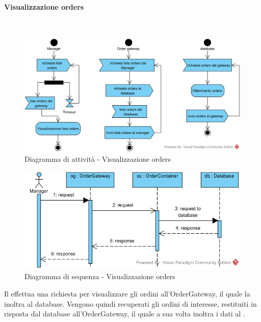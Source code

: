 \paragraph{Visualizzazione orders}\mbox{}\\
\nopagebreak
\begin{figure}[H]
	\centering
	\includegraphics[width=14cm]{diagrammi_img/attivita/manager_ordini.png}
	\caption{Diagramma di attività - Visualizzazione orders}
\end{figure}

\begin{figure}[H]
	\centering
	\includegraphics[width=14cm]{../../documenti/SpecificaTecnica/diagrammi_img/sequenza/direttore_visualizza_orders.png}
	\caption{Diagramma di sequenza - Visualizzazione orders}
\end{figure}
Il \Manager{} effettua una richiesta per visualizzare gli ordini all'Order\-Gateway, il quale la inoltra al database. Vengono quindi recuperati gli ordini di interesse, restituiti in risposta dal database all'Order\-Gateway, il quale a sua volta inoltra i dati al \Manager{}.

